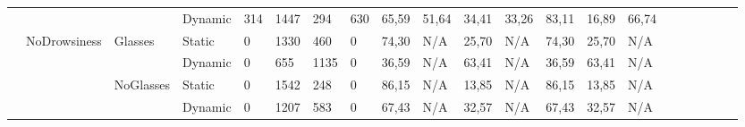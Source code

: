 \documentclass[12pt]{article}
\begin{document}
\begin{landscape}
\begin{table}[]
\begin{adjustbox}{width=1.4\textwidth}
\begin{tabular}{lllllllllllllllccllll}
				\multicolumn{1}{|l|}{} & \multicolumn{1}{l|}{} & \multicolumn{1}{l|}{} & \multicolumn{1}{l|}{Dynamic} & \multicolumn{1}{l|}{314} & \multicolumn{1}{l|}{1447} & \multicolumn{1}{l|}{294} & \multicolumn{1}{l|}{630} & \multicolumn{1}{l|}{65,59} & \multicolumn{1}{l|}{51,64} & \multicolumn{1}{l|}{34,41} & \multicolumn{1}{l|}{33,26} & \multicolumn{1}{l|}{83,11} & \multicolumn{1}{l|}{16,89} & \multicolumn{1}{l|}{66,74} & \multicolumn{1}{c|}{} & \multicolumn{1}{c|}{} & \multicolumn{1}{l|}{} & \multicolumn{1}{l|}{} & \multicolumn{1}{l|}{} & \multicolumn{1}{l|}{} \\ \cline{2-15}
				\multicolumn{1}{|l|}{} & \multicolumn{1}{l|}{\multirow{4}{*}{NoDrowsiness}} & \multicolumn{1}{l|}{\multirow{2}{*}{Glasses}} & \multicolumn{1}{l|}{Static} & \multicolumn{1}{l|}{0} & \multicolumn{1}{l|}{1330} & \multicolumn{1}{l|}{460} & \multicolumn{1}{l|}{0} & \multicolumn{1}{l|}{74,30} & \multicolumn{1}{l|}{N/A} & \multicolumn{1}{l|}{25,70} & \multicolumn{1}{l|}{N/A} & \multicolumn{1}{l|}{74,30} & \multicolumn{1}{l|}{25,70} & \multicolumn{1}{l|}{N/A} & \multicolumn{1}{c|}{} & \multicolumn{1}{c|}{} & \multicolumn{1}{l|}{} & \multicolumn{1}{l|}{} & \multicolumn{1}{l|}{} & \multicolumn{1}{l|}{} \\ \cline{4-15}
				\multicolumn{1}{|l|}{} & \multicolumn{1}{l|}{} & \multicolumn{1}{l|}{} & \multicolumn{1}{l|}{Dynamic} & \multicolumn{1}{l|}{0} & \multicolumn{1}{l|}{655} & \multicolumn{1}{l|}{1135} & \multicolumn{1}{l|}{0} & \multicolumn{1}{l|}{36,59} & \multicolumn{1}{l|}{N/A} & \multicolumn{1}{l|}{63,41} & \multicolumn{1}{l|}{N/A} & \multicolumn{1}{l|}{36,59} & \multicolumn{1}{l|}{63,41} & \multicolumn{1}{l|}{N/A} & \multicolumn{1}{c|}{} & \multicolumn{1}{c|}{} & \multicolumn{1}{l|}{} & \multicolumn{1}{l|}{} & \multicolumn{1}{l|}{} & \multicolumn{1}{l|}{} \\ \cline{3-15}
				\multicolumn{1}{|l|}{} & \multicolumn{1}{l|}{} & \multicolumn{1}{l|}{\multirow{2}{*}{NoGlasses}} & \multicolumn{1}{l|}{Static}  & \multicolumn{1}{l|}{0} & \multicolumn{1}{l|}{1542} & \multicolumn{1}{l|}{248} & \multicolumn{1}{l|}{0} & \multicolumn{1}{l|}{86,15} & \multicolumn{1}{l|}{N/A} & \multicolumn{1}{l|}{13,85} & \multicolumn{1}{l|}{N/A} & \multicolumn{1}{l|}{86,15} & \multicolumn{1}{l|}{13,85} & \multicolumn{1}{l|}{N/A} & \multicolumn{1}{c|}{} & \multicolumn{1}{c|}{} & \multicolumn{1}{l|}{} & \multicolumn{1}{l|}{} & \multicolumn{1}{l|}{} & \multicolumn{1}{l|}{} \\ \cline{4-15}
				\multicolumn{1}{|l|}{} & \multicolumn{1}{l|}{} & \multicolumn{1}{l|}{} & \multicolumn{1}{l|}{Dynamic} & \multicolumn{1}{l|}{0} & \multicolumn{1}{l|}{1207} & \multicolumn{1}{l|}{583} & \multicolumn{1}{l|}{0} & \multicolumn{1}{l|}{67,43} & \multicolumn{1}{l|}{N/A} & \multicolumn{1}{l|}{32,57} & \multicolumn{1}{l|}{N/A} & \multicolumn{1}{l|}{67,43} & \multicolumn{1}{l|}{32,57} & \multicolumn{1}{l|}{N/A} & \multicolumn{1}{c|}{} & \multicolumn{1}{c|}{} & \multicolumn{1}{l|}{} & \multicolumn{1}{l|}{} & \multicolumn{1}{l|}{} & \multicolumn{1}{l|}{} \\ \hline

\end{tabular}
\end{adjustbox}
\end{table}
\end{landscape}
\end{document}
